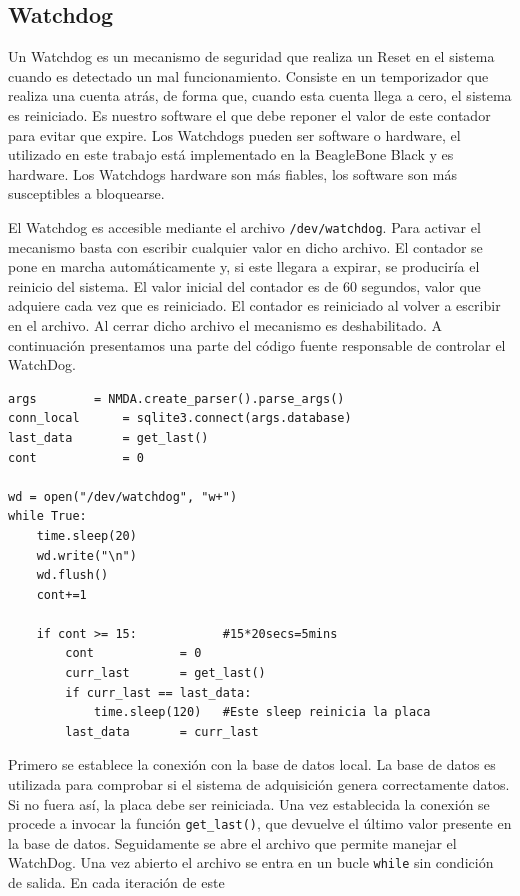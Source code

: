 	\subsection{Watchdog}
		Un Watchdog \cite{WatchDogWiki} es un mecanismo de seguridad que realiza un Reset en el sistema cuando es detectado un mal
		funcionamiento. Consiste en un temporizador que realiza una cuenta atrás, de forma que, cuando esta cuenta llega a cero, el sistema es
		reiniciado. Es nuestro software el que debe reponer el valor de este contador para evitar que expire. Los Watchdogs pueden ser
		software o hardware, el utilizado en este trabajo está implementado en la BeagleBone Black y es hardware. Los Watchdogs hardware son
		más fiables, los software son más susceptibles a bloquearse.
		\par
		El Watchdog es accesible mediante el archivo \texttt{/dev/watchdog}. Para activar el mecanismo basta con escribir cualquier valor en
		dicho archivo. El contador se pone en marcha automáticamente y, si este llegara a expirar, se produciría el reinicio del sistema. El
		valor inicial del contador es de 60 segundos, valor que adquiere cada vez que es reiniciado. El contador es reiniciado al volver a
		escribir en el archivo. Al cerrar dicho archivo el mecanismo es deshabilitado. A continuación presentamos una parte del código fuente
		responsable de controlar el WatchDog.
		\begin{lstlisting}[style=myPython]
args		= NMDA.create_parser().parse_args()
conn_local      = sqlite3.connect(args.database)
last_data       = get_last()
cont            = 0

wd = open("/dev/watchdog", "w+")
while True:
    time.sleep(20)
    wd.write("\n")
    wd.flush()
    cont+=1

    if cont >= 15:            #15*20secs=5mins
        cont            = 0
        curr_last       = get_last()
        if curr_last == last_data:
            time.sleep(120)   #Este sleep reinicia la placa
        last_data       = curr_last
		\end{lstlisting}
		\par
		Primero se establece la conexión con la base de datos local. La base de datos es utilizada para comprobar si el sistema de adquisición
		genera correctamente datos. Si no fuera así, la placa debe ser reiniciada. Una vez establecida la conexión se procede a invocar la
		función \texttt{get\_last()}, que devuelve el último valor presente en la base de datos. Seguidamente se abre el archivo que permite
		manejar el WatchDog. Una vez abierto el archivo se entra en un bucle \texttt{while} sin condición de salida. En cada iteración de este

